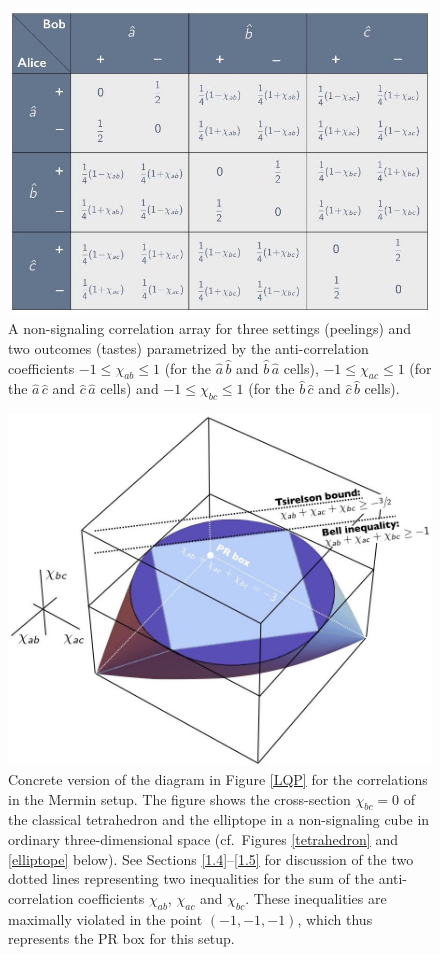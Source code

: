 \begin{figure}[h]
 \centering
   \includegraphics[width=5in]{CA-3set2out-non-signaling-chis.jpeg} 
   \caption{A non-signaling correlation array for three settings (peelings) and two outcomes (tastes) parametrized by the anti-correlation coefficients $-1 \le \chi_{ab} \le 1$ (for the $\hat{a} \, \hat{b}$ and  $\hat{b} \, \hat{a}$ cells), $-1 \le \chi_{ac} \le 1$ (for the $\hat{a} \, \hat{c}$ and  $\hat{c} \, \hat{a}$ cells) and $-1 \le \chi_{bc} \le 1$ (for the $\hat{b} \, \hat{c}$ and  $\hat{c} \, \hat{b}$ cells).}
   \label{CA-3set2out-non-signaling-chis}
\end{figure}

\begin{figure}[h]
\centering
\includegraphics[width=4.6in]{elliptope-LQPslice.jpeg}
\caption{Concrete version of the diagram in Figure \ref{LQP} for the correlations in the Mermin setup. The figure shows the cross-section $\chi_{bc} =0$ of the classical tetrahedron and the elliptope in a non-signaling cube in ordinary three-dimensional space (cf.\ Figures \ref{tetrahedron} and \ref{elliptope} below). See Sections  \ref{1.4}--\ref{1.5} for discussion of the two dotted lines representing two inequalities for the sum of the anti-correlation coefficients $\chi_{ab}$, $\chi_{ac}$ and $\chi_{bc}$. These inequalities are maximally violated in the point $(-1, -1, -1)$, which thus represents the PR box for this setup.}
   \label{elliptope-LQPslice}
\end{figure} 

